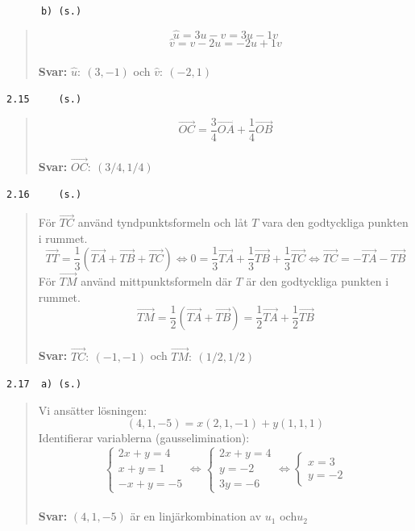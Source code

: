 \documentclass[a4paper]{article}
\newcommand{\tskcol}[1]{\textcolor{tskcol}{#1}}
\newcommand{\vek}[1]{\overrightarrow{#1}}
\begin{document}
\texttt{\tskcol{~~~~~~b) (s.)}}
\begin{quotation}
	\noindent
	\[\hat{u}=3u-v=3u-1v\]
	\[\hat{v}=v-2u=-2u+1v\]
	\\
	\textbf{Svar:} $\hat{u}:~(3,-1)$ och $\hat{v}:~(-2,1)$
\end{quotation}

\texttt{\tskcol{2.15~~~~ (s.)}}
\begin{quotation}
	\noindent
	\[\vek{OC}=\frac{3}{4}\vek{OA}+\frac{1}{4}\vek{OB}\]
	\\ 
	\textbf{Svar:} $\vek{OC}:~(3/4,1/4)$
\end{quotation}

\texttt{\tskcol{2.16~~~~ (s.)}}
\begin{quotation}
	\noindent
	För $\vek{TC}$ använd tyndpunktsformeln och låt $T$ vara den godtyckliga punkten i rummet.
	\[\vek{TT}=\frac{1}{3}(\vek{TA}+\vek{TB}+\vek{TC}) \Leftrightarrow
	0=\frac{1}{3}\vek{TA}+\frac{1}{3}\vek{TB}+\frac{1}{3}\vek{TC} \Leftrightarrow
	\vek{TC}=-\vek{TA}-\vek{TB}\]
	För $\vek{TM}$ använd mittpunktsformeln där $T$ är den godtyckliga punkten i rummet.
	\[\vek{TM}=\frac{1}{2}(\vek{TA}+\vek{TB})=\frac{1}{2}\vek{TA}+\frac{1}{2}\vek{TB}\]
	\\
	\textbf{Svar:} $\vek{TC}:~(-1,-1)$ och $\vek{TM}:~(1/2,1/2)$
\end{quotation}

\texttt{\tskcol{2.17~~a) (s.)}}
\begin{quotation}
	\noindent
	Vi ansätter lösningen:
	\[(4,1,-5)=x(2,1,-1)+y(1,1,1)\]
	Identifierar variablerna (gausselimination):
	\[\begin{cases}
	2x+y=4 \\
	x+y=1 \\
	-x+y=-5
	\end{cases} \Leftrightarrow
	\begin{cases}
	2x+y=4 \\
	y=-2 \\
	3y=-6
	\end{cases} \Leftrightarrow
	\begin{cases}
	x=3 \\
	y=-2
	\end{cases}\]
	\\ 
	\textbf{Svar:} $(4,1,-5)$ är en linjärkombination av $u_1$ och$u_2$
\end{quotation}
\end{document}
